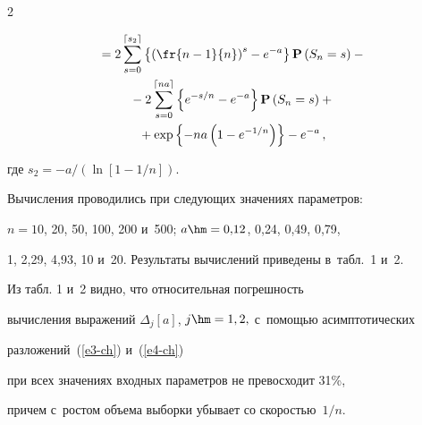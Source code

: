 \begin{multicols}{2}
 


\noindent


  \begin{multline}


{} =2\sum\limits_{s=0}^{\lceil s_2 \rceil}


 \left\{\left(\fr{n-1}{n}\right)^s-e^{-a} \right\}\mathbf{P}\left(S_n=s\right)


 -{}\\


 {}- 2\sum\limits_{s=0}^{\lceil n a \rceil}


 \left\{e^{-s/n}-e^{-a} \right\}\mathbf{P}\left(S_n=s\right)+{}


 \\ 


{} +\exp\left\{-n a \left(1-e^{-1/n}\right) \right\}-e^{-a}\,,


 \label{e56-ch}


 \end{multline}


где $s_2=-{a}/({\ln[1-1/n]})$.








 Вычисления проводились при следующих значениях параметров:


  $n=10$, 20, 50, 100, 200 и~500;  $a\hm=0{,}12$, 0{,}24, 0{,}49, 0{,}79,


 1, 2{,}29, 4{,}93, 10 и~20. Результаты вычислений приведены в~табл.~1 и~2.


 {


 


 }













 Из табл. 1 и~2 видно, что относительная погрешность


 вычисления выражений $\Delta_j[a]$, $j\hm=1,2,$ с~по\-мощью асимптотических 


 разложений~(\ref{e3-ch}) и~(\ref{e4-ch}) 


 при всех значениях входных параметров не превосходит 31\%,


 причем с~ростом объема выборки убывает со скоростью~$1/n$.






\end{multicols}
